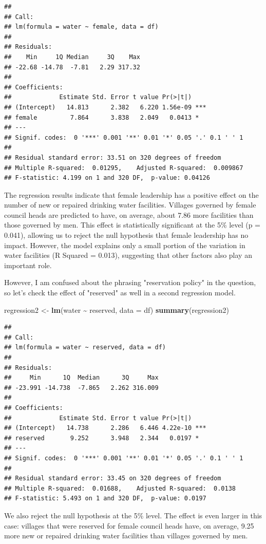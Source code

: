 \documentclass[
]{article}
\newenvironment{Shaded}{\begin{snugshade}}{\end{snugshade}}
\newcommand{\AttributeTok}[1]{\textcolor[rgb]{0.13,0.29,0.53}{#1}}
\newcommand{\FunctionTok}[1]{\textcolor[rgb]{0.13,0.29,0.53}{\textbf{#1}}}
\newcommand{\NormalTok}[1]{#1}
\newcommand{\OtherTok}[1]{\textcolor[rgb]{0.56,0.35,0.01}{#1}}
\newcommand{\SpecialCharTok}[1]{\textcolor[rgb]{0.81,0.36,0.00}{\textbf{#1}}}
\begin{document}
\begin{verbatim}
## 
## Call:
## lm(formula = water ~ female, data = df)
## 
## Residuals:
##    Min     1Q Median     3Q    Max 
## -22.68 -14.78  -7.81   2.29 317.32 
## 
## Coefficients:
##             Estimate Std. Error t value Pr(>|t|)    
## (Intercept)   14.813      2.382   6.220 1.56e-09 ***
## female         7.864      3.838   2.049   0.0413 *  
## ---
## Signif. codes:  0 '***' 0.001 '**' 0.01 '*' 0.05 '.' 0.1 ' ' 1
## 
## Residual standard error: 33.51 on 320 degrees of freedom
## Multiple R-squared:  0.01295,    Adjusted R-squared:  0.009867 
## F-statistic: 4.199 on 1 and 320 DF,  p-value: 0.04126
\end{verbatim}


The regression results indicate that female leadership has a positive effect on the number of new or repaired drinking water facilities. Villages governed by female council heads are predicted to have, on average, about 7.86 more facilities than those governed by men. This effect is statistically significant at the 5\% level (p = 0.041), allowing us to reject the null hypothesis that female leadership has no impact. However, the model explains only a small portion of the variation in water facilities (R Squared = 0.013), suggesting that other factors also play an important role.



However, I am confused about the phrasing "reservation policy" in the question, so let's check the effect of "reserved" as well in a second regression model. 

\begin{Shaded}
	\begin{Highlighting}[]
\NormalTok{regression2 }\OtherTok{\textless{}{-}} \FunctionTok{lm}\NormalTok{(water }\SpecialCharTok{\textasciitilde{}}\NormalTok{ reserved, }\AttributeTok{data =}\NormalTok{ df)}
\FunctionTok{summary}\NormalTok{(regression2)}
\end{Highlighting}
\end{Shaded}

\begin{verbatim}
## 
## Call:
## lm(formula = water ~ reserved, data = df)
## 
## Residuals:
##     Min      1Q  Median      3Q     Max 
## -23.991 -14.738  -7.865   2.262 316.009 
## 
## Coefficients:
##             Estimate Std. Error t value Pr(>|t|)    
## (Intercept)   14.738      2.286   6.446 4.22e-10 ***
## reserved       9.252      3.948   2.344   0.0197 *  
## ---
## Signif. codes:  0 '***' 0.001 '**' 0.01 '*' 0.05 '.' 0.1 ' ' 1
## 
## Residual standard error: 33.45 on 320 degrees of freedom
## Multiple R-squared:  0.01688,    Adjusted R-squared:  0.0138 
## F-statistic: 5.493 on 1 and 320 DF,  p-value: 0.0197
\end{verbatim}

We also reject the null hypothesis at the 5\% level. The effect is even larger in this case: villages that were reserved for female council heads have, on average, 9.25 more new or repaired drinking water facilities than villages governed by men.
\end{document}
